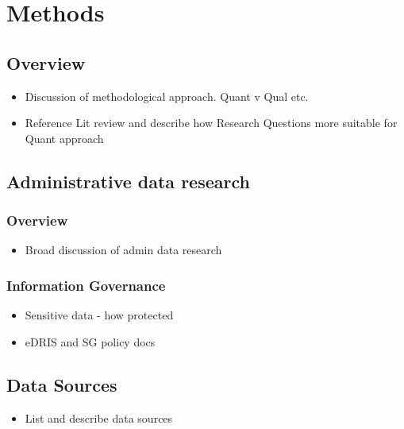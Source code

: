 \documentclass[12pt,]{report}
\providecommand{\tightlist}{%
  \setlength{\itemsep}{0pt}\setlength{\parskip}{0pt}}
\begin{document}
\FloatBarrier
\newpage
{}

\chapter{Methods}\label{ch:methods}

\section{Overview}\label{sec:methods-overview}

\begin{itemize}
\tightlist
\item
  Discussion of methodological approach. Quant v Qual etc.
\item
  Reference Lit review and describe how Research Questions more suitable
  for Quant approach
\end{itemize}

\section{Administrative data research}\label{sec:methods-admindata}

\subsection{Overview}\label{subsec:admin-data-overview}

\begin{itemize}
\tightlist
\item
  Broad discussion of admin data research
\end{itemize}

\subsection{Information Governance}\label{subsec:IG}

\begin{itemize}
\tightlist
\item
  Sensitive data - how protected
\item
  eDRIS and SG policy docs
\end{itemize}

\section{Data Sources}\label{sec:methods-data}

\begin{itemize}
\tightlist
\item
  List and describe data sources
\end{itemize}
\end{document}
